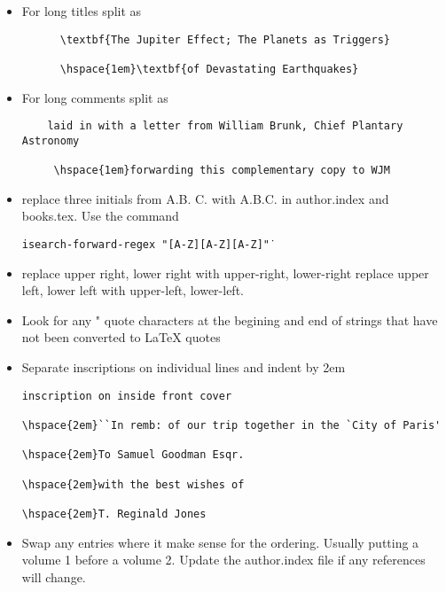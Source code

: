 \documentclass{article}
\begin{document}
\begin{itemize}
\item For long titles split as
\begin{verbatim}
      \textbf{The Jupiter Effect; The Planets as Triggers}
 
      \hspace{1em}\textbf{of Devastating Earthquakes}
\end{verbatim}

\item For long comments split as
\begin{verbatim}
    laid in with a letter from William Brunk, Chief Plantary Astronomy

     \hspace{1em}forwarding this complementary copy to WJM
\end{verbatim}

 \item replace three initials from A.B. C. with A.B.C.
   in author.index and books.tex.  Use the command
   
   \texttt{isearch-forward-regex "[A-Z]\.[A-Z]\. [A-Z]\."}

 \item replace upper right, lower right with upper-right, lower-right
   replace upper left, lower left with upper-left, lower-left.

 \item Look for any " quote characters at the begining and end of strings
       that have not been converted to LaTeX quotes

     \item Separate inscriptions on individual lines and indent by 2em
\begin{verbatim}
inscription on inside front cover

\hspace{2em}``In remb: of our trip together in the `City of Paris'

\hspace{2em}To Samuel Goodman Esqr.

\hspace{2em}with the best wishes of

\hspace{2em}T. Reginald Jones
\end{verbatim}

  \item Swap any entries where it make sense for the ordering. Usually
    putting a volume 1 before a volume 2.  Update the author.index
    file if any references will change.

\end{itemize}
\end{document}
